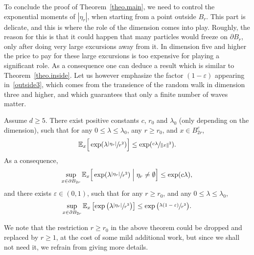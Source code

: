 To conclude the proof of Theorem~\ref{theo.main},
we need to control the exponential moments of $|\eta_r|$,
when starting from a point outside $B_r$.
This part is delicate, and this is where the role of the dimension
comes into play. Roughly, the reason for this is that
it could happen that many particles would freeze
on $\partial B_r$, only after doing very large excursions away from it.
In dimension five and higher the price to pay for
these large excursions is too expensive for playing a significant role.
As a consequence one can deduce
a result which is similar to Theorem~\ref{theo.inside}.
Let us however emphasize the factor $(1-\varepsilon)$
appearing in~\eqref{outside3}, which
comes from the transience of the random walk in
dimension three and higher,
and which guarantees that only a finite number of waves matter.

\begin{theorem}\label{theo.outside5}
Assume $d\ge 5$.
There exist positive constants $c$, $r_0$ and $\lambda_0$ (only depending on the dimension), such that for any $0\le \lambda\le \lambda_0$, any $r\ge r_0$,
and $x\in B_{2r}^c$,
\begin{equation}\label{outside1}
\mathbb E_x\Big[\exp(\lambda \sfrac{|\eta_r|}{r^2})\Big] \le \exp(\sfrac{c\lambda}{\|x\|^2}).
\end{equation}
As a consequence,
\begin{equation}\label{outside2}
\sup_{x\in \partial B_{2r}} \mathbb E_x\Big[\exp(\lambda \sfrac{|\eta_r|}{r^2})
\Bigm|\eta_r\neq \emptyset \Big] \le \exp(c\lambda),
\end{equation}
and there exists $\varepsilon\in (0,1)$, such that for any $r\ge r_0$, and any $0\le \lambda\le \lambda_0$,
\begin{equation}\label{outside3}
\sup_{x\in \partial B_{2r}} \mathbb E_x\left[\exp\big(\lambda \sfrac{
|\eta_r|}{r^2}\big)\right] \le \exp\big(\sfrac{\lambda (1-\varepsilon)}{r^2}\big).
\end{equation}
\end{theorem}
We note that the restriction $r\ge r_0$ in the above theorem could be dropped and replaced by $r\ge 1$, at the cost of some mild additional work, but since we shall not need it, we refrain from giving more details.

